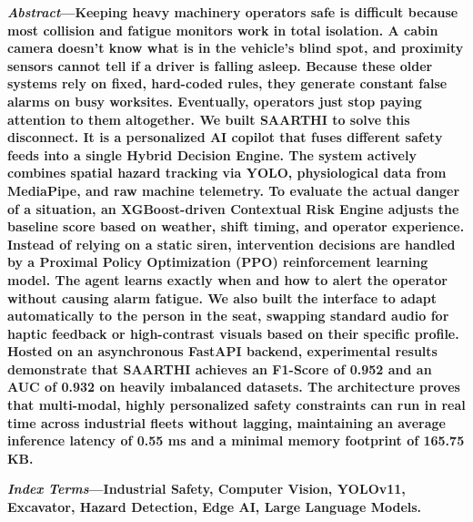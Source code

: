 \begin{strip}
\vspace{-1.2cm} %

\noindent\textbf{\textit{Abstract}---Keeping heavy machinery operators safe is difficult because most collision and fatigue monitors work in total isolation. A cabin camera doesn't know what is in the vehicle's blind spot, and proximity sensors cannot tell if a driver is falling asleep. Because these older systems rely on fixed, hard-coded rules, they generate constant false alarms on busy worksites. Eventually, operators just stop paying attention to them altogether. We built SAARTHI to solve this disconnect. It is a personalized AI copilot that fuses different safety feeds into a single Hybrid Decision Engine. The system actively combines spatial hazard tracking via YOLO, physiological data from MediaPipe, and raw machine telemetry. To evaluate the actual danger of a situation, an XGBoost-driven Contextual Risk Engine adjusts the baseline score based on weather, shift timing, and operator experience. Instead of relying on a static siren, intervention decisions are handled by a Proximal Policy Optimization (PPO) reinforcement learning model. The agent learns exactly when and how to alert the operator without causing alarm fatigue. We also built the interface to adapt automatically to the person in the seat, swapping standard audio for haptic feedback or high-contrast visuals based on their specific profile. Hosted on an asynchronous FastAPI backend, experimental results demonstrate that SAARTHI achieves an F1-Score of 0.952 and an AUC of 0.932 on heavily imbalanced datasets. The architecture proves that multi-modal, highly personalized safety constraints can run in real time across industrial fleets without lagging, maintaining an average inference latency of 0.55 ms and a minimal memory footprint of 165.75 KB.}

\vspace{0.3cm}

\noindent\textbf{\textit{Index Terms}---Industrial Safety, Computer Vision, YOLOv11, Excavator, Hazard Detection, Edge AI, Large Language Models.}

\vspace{0.6cm} %
\end{strip}
